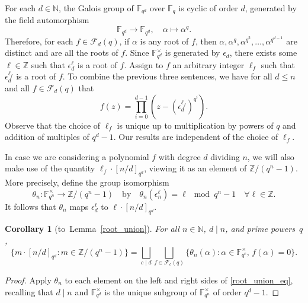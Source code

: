 \documentclass[10pt]{article}
\newtheorem{corollary}[theorem]{Corollary}
\theoremstyle{definition}
\newcommand{\F}{\mathbb{F}}
\newcommand{\CF}{\mathcal{F}}
\newcommand{\N}{\mathbb{N}}
\newcommand{\Z}{\mathbb{Z}}
\newcommand{\eps}{\epsilon}
\newcommand{\te}{\theta}
\begin{document}
For each \(d \in \N\), the Galois group of \(\F_{q^d}\) over \(\F_q\) is cyclic of order \(d\), generated by the field automorphism
\[
\F_{q^d} \to \F_{q^d}, \quad \alpha \mapsto \alpha^q.
\]
Therefore, for each \(f \in \CF_d (q)\), if \(\alpha\) is any root of \(f\), then
\(\alpha,\alpha^q,\alpha^{q^2},\ldots,\alpha^{q^{d-1}}\)
are distinct and are all the roots of \(f\).
Since \(\F_{q^d}^\times\) is generated by \(\eps_d\), there exists some \(\ell \in \Z\) such that \(\eps_d^\ell\) is a root of \(f\).
Assign to \(f\) an arbitrary integer \(\ell_f\) such that \(\eps_d^{\ell_f}\) is a root of \(f\).
To combine the previous three sentences,
we have for all \(d \leq n\) and all \(f \in \CF_d(q)\) that
\begin{equation}
\label{who_are_my_roots}
f(z) = \prod_{i=0}^{d-1}
\left (
z - \left ( \eps_d^{\ell_f} \right )^{q^i}
\right ).
\end{equation}
Observe that the choice of \(\ell_f\) is unique up to multiplication by powers of \(q\) and addition of multiples of \(q^d - 1\).
Our results are independent of the choice of \(\ell_f\).

In case we are considering a polynomial \(f\) with degree \(d\) dividing \(n\), we will also make use of the quantity \(\ell_f \cdot [n/d]_{q^d}\), viewing it as an element of \(\Z / (q^n-1)\).
More precisely, define the group isomorphism
\begin{equation}
\label{te_n_def}
\te_n : \F_{q^n}^\times \to \Z / (q^n-1)
\quad \text{by} \quad
\te_n \left ( \eps_n^{\ell} \right ) = \ell \mod q^n-1
\quad
\forall \ell \in \Z.
\end{equation}
It follows that
\(\te_n\) maps \(\eps_d^{\ell}\) to \(\ell \cdot [n/d]_{q^d}\).

\begin{corollary}[to~Lemma~\ref{root_union}]
\label{te_n_map_property}
For all \(n \in \N\), \(d \mid n\), and prime powers~\(q\),
\begin{equation}
\{ m \cdot [n/d]_{q^d} : m \in \Z / (q^n-1) \}
=
\bigsqcup_{c \mid d}
\bigsqcup_{f \in \CF_c (q)}
\{\te_n(\alpha) : \alpha \in \F_{q^c}^\times, \,  f(\alpha) = 0\}.
\end{equation}
\end{corollary}

\begin{proof}
Apply \(\te_n\) to each element on the left and right sides of \eqref{root_union_eq}, recalling that \(d \mid n\) and \(\F_{q^d}^\times\) is the unique subgroup of \(\F_{q^n}^\times\) of order \(q^d-1\).
\end{proof}
\end{document}
